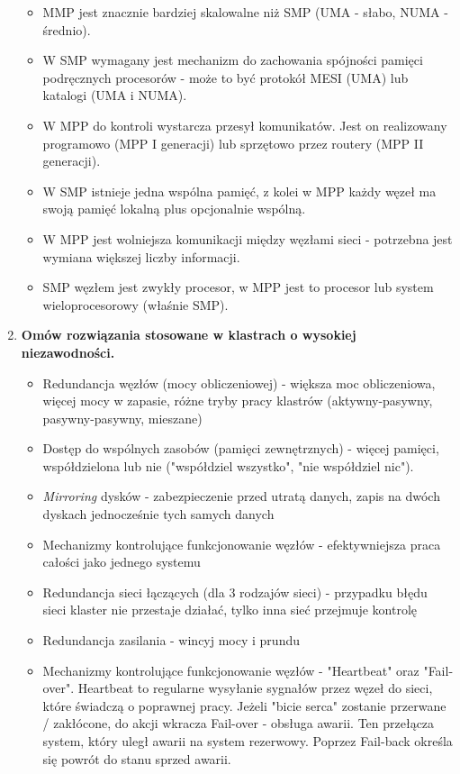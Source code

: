 \begin{enumerate}
\begin{samepage}
\begin{itemize}
				\item MMP jest znacznie bardziej skalowalne niż SMP (UMA - słabo, NUMA - średnio).
				\item W SMP wymagany jest mechanizm do zachowania spójności pamięci podręcznych procesorów - może to być protokół MESI (UMA) lub katalogi (UMA i NUMA).
				\item W MPP do kontroli wystarcza przesył komunikatów. Jest on realizowany programowo (MPP I generacji) lub sprzętowo przez routery (MPP II generacji).
				\item W SMP istnieje jedna wspólna pamięć, z kolei w MPP każdy węzeł ma swoją pamięć lokalną plus opcjonalnie wspólną.
				\item W MPP jest wolniejsza komunikacji między węzłami sieci - potrzebna jest wymiana większej liczby informacji.
				\item SMP węzłem jest zwykły procesor, w MPP jest to procesor lub system wieloprocesorowy (właśnie SMP).
			\end{itemize}
			\end{samepage}
			
			\item \textbf{Omów rozwiązania stosowane w klastrach o wysokiej niezawodności.}
			\begin{samepage}
			\begin{itemize}
				\item Redundancja węzłów (mocy obliczeniowej) - większa moc obliczeniowa, więcej mocy w zapasie, różne tryby pracy klastrów (aktywny-pasywny, pasywny-pasywny, mieszane)
				\item Dostęp do wspólnych zasobów (pamięci zewnętrznych) - więcej pamięci, współdzielona lub nie ("współdziel wszystko", "nie współdziel nic").
				\item \textit{Mirroring} dysków - zabezpieczenie przed utratą danych, zapis na dwóch dyskach jednocześnie tych samych danych
				\item Mechanizmy kontrolujące funkcjonowanie węzłów - efektywniejsza praca całości jako jednego systemu
				\item Redundancja sieci łączących (dla 3 rodzajów sieci) - przypadku błędu sieci klaster nie przestaje działać, tylko inna sieć przejmuje kontrolę
				\item Redundancja zasilania - wincyj mocy i prundu
				\item Mechanizmy kontrolujące funkcjonowanie węzłów - "Heartbeat" oraz "Fail-over". Heartbeat to regularne wysyłanie sygnałów przez węzeł do sieci, które świadczą o poprawnej pracy. Jeżeli "bicie serca" zostanie przerwane / zakłócone, do akcji wkracza Fail-over - obsługa awarii. Ten przełącza system, który uległ awarii na system rezerwowy. Poprzez Fail-back określa się powrót do stanu sprzed awarii.
			\end{itemize}
			\end{samepage}
		\end{enumerate}
